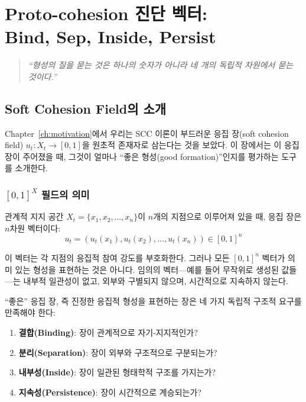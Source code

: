 
\chapter{Proto-cohesion 진단 벡터:\\Bind, Sep, Inside, Persist}
\label{ch:diagnostic-vector}

\begin{quote}
\textit{``형성의 질을 묻는 것은 하나의 숫자가 아니라 네 개의 독립적 차원에서 묻는 것이다.''}
\end{quote}

\section{Soft Cohesion Field의 소개}
\label{sec:soft-field-intro}

Chapter~\ref{ch:motivation}에서 우리는 SCC 이론이 부드러운 응집 장(soft cohesion field) $u_t : X_t \to [0,1]$을 원초적 존재자로 삼는다는 것을 보았다. 이 장에서는 이 응집 장이 주어졌을 때, 그것이 얼마나 ``좋은 형성(good formation)''인지를 평가하는 도구를 소개한다.

\subsection{$[0,1]^X$ 필드의 의미}

관계적 지지 공간 $X_t = \{x_1, x_2, \ldots, x_n\}$이 $n$개의 지점으로 이루어져 있을 때, 응집 장은 $n$차원 벡터이다:
\begin{equation}
    u_t = (u_t(x_1), u_t(x_2), \ldots, u_t(x_n)) \in [0,1]^n
    \label{eq:field-as-vector}
\end{equation}

이 벡터는 각 지점의 응집적 참여 강도를 부호화한다. 그러나 모든 $[0,1]^n$ 벡터가 의미 있는 형성을 표현하는 것은 아니다. 임의의 벡터---예를 들어 무작위로 생성된 값들---는 내부적 일관성이 없고, 외부와 구별되지 않으며, 시간적으로 지속하지 않는다.

``좋은'' 응집 장, 즉 진정한 응집적 형성을 표현하는 장은 네 가지 독립적 구조적 요구를 만족해야 한다:
\begin{enumerate}
    \item \textbf{결합(Binding)}: 장이 관계적으로 자기-지지적인가?
    \item \textbf{분리(Separation)}: 장이 외부와 구조적으로 구분되는가?
    \item \textbf{내부성(Inside)}: 장이 일관된 형태학적 구조를 가지는가?
    \item \textbf{지속성(Persistence)}: 장이 시간적으로 계승되는가?
\end{enumerate}

